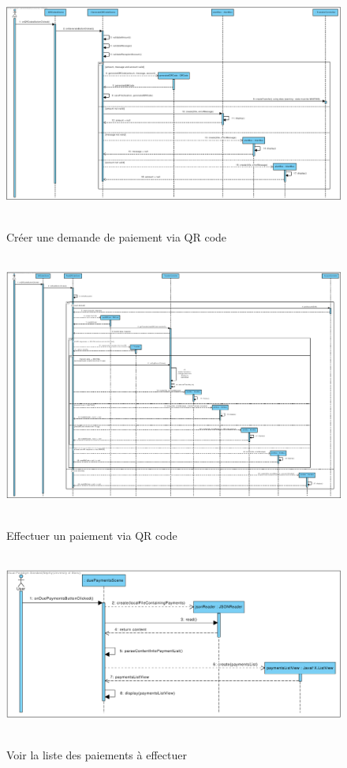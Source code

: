 \documentclass[]{report}
\begin{document}
\begin{figure}[h!]
\hbox{
    \centering\includegraphics[width=\linewidth]{img/Sequence 1 - Extension 6.pdf}
}
\caption{Créer une demande de paiement via QR code}
\end{figure}



\newpage

\begin{figure}[h!]
\hbox{
    \centering\includegraphics[width=\linewidth]{img/Sequence 2 - Extension 6.pdf}
}
\caption{Effectuer un paiement via QR code}
\end{figure}



\newpage

\begin{figure}[h!]
\hbox{
    \centering\includegraphics[width=\linewidth]{img/Sequence 3 - Extension 6.pdf}
}
\caption{Voir la liste des paiements à effectuer}
\end{figure}
\end{document}
